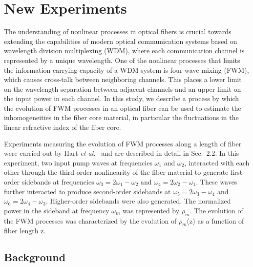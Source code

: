 \appendix
\renewcommand{\thechapter}{B}
\renewcommand{\chaptername}{Appendix}

\chapter{New Experiments}

The understanding of nonlinear processes in optical fibers is crucial towards 
extending the capabilities of modern optical communication systems based on 
wavelength division multiplexing (WDM), where each communication channel is 
represented by a unique wavelength. One of the nonlinear processes that 
limits the information carrying capacity of a WDM system is four-wave mixing 
(FWM), which causes cross-talk between neighboring channels. This places a 
lower limit on the wavelength separation between adjacent channels and an
upper limit on the input power in each channel. In this study, we describe
a process by which the evolution of FWM processes in an optical fiber can be 
used to estimate the inhomogeneities in the fiber core material, in particular 
the fluctuations in the linear refractive index of the fiber core.  

Experiments measuring the evolution of FWM processes along a length of fiber 
were carried out by Hart {\it et al.}\ \cite{hart1} and are described in detail in 
Sec.\ 2.2. In this experiment, two input pump waves at frequencies
$\omega_1$ and $\omega_2$, interacted with each other through the third-order 
nonlinearity of the fiber material to generate first-order sidebands at frequencies 
$\omega_3 = 2\omega_1 - \omega_2$ and $\omega_4 = 2\omega_2 - \omega_1$. 
These waves further interacted to produce second-order sidebands at 
$\omega_5 = 2\omega_3 - \omega_4$ and $\omega_6 = 2\omega_4 - \omega_3$. 
Higher-order sidebands were also generated. The normalized power in the 
sideband at frequency $\omega_m$ was represented by $\rho_m$. The 
evolution of the FWM processes was characterized by the evolution of 
$\rho_m$(z) as a function of fiber length z. 

\section{Background}

